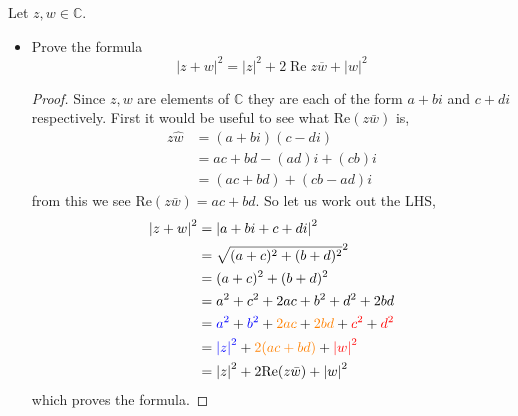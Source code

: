 \documentclass[11pt]{article}
\newenvironment{problem}[2][Problem\!]{\begin{trivlist}
\item[\hskip \labelsep {\bfseries #1}\hskip \labelsep {\bfseries #2.}]}{\end{trivlist}}
\newcommand{\cc}{\mathbb C}   %
\newcommand{\abs}[1]{\left\lvert#1\right\rvert} %
\renewcommand{\Re}{\operatorname{Re}}
\newcommand{\tcr}[1]{\textcolor{red}{#1}}
\newcommand{\tcb}[1]{\textcolor{blue}{#1}}
\newcommand{\tco}[1]{\textcolor{orange}{#1}}
\begin{document}
\begin{problem}{1.3}
Let $z,w \in \cc$. 
\begin{itemize}[itemsep=3em]
\item[(a)] Prove the formula
\[\abs{z+w}^2 = \abs{z}^2 + 2 \Re z\overline{w} + \abs{w}^2\]
\begin{example}
    \begin{proof}
        Since $z,w$ are elements of $\cc$ they are each of the form $a+bi$ and $c+di$ respectively. First it would be useful to see what $\text{Re}(z\bar{w})$ is,
        \begin{align*}
            z\hat{w} &= (a+bi)(c-di) \\
            &= ac + bd - (ad)i +(cb)i  \\
            &= (ac + bd) + (cb -ad)i
        \end{align*}
        from this we see Re$(z\bar{w}) = ac + bd$. So let us work out the LHS,
        \begin{align*}
            \abs{z +w}^{2} &= \abs{a + bi + c + di}^{2} \\
            &= \sqrt{(a+c)^{2} + (b+d)^{2}}^{2} \\
            &= (a+c)^{2} + (b+d)^{2} \\
            &= a^{2} + c^{2} + 2ac + b^{2} + d^{2} + 2bd \\
            &= \tcb{a^{2}} + \tcb{b^{2}} + \tco{2ac} + \tco{2bd}+ \tcr{c^{2}} + \tcr{d^{2}}  \\
            &= \tcb{\abs{z}^{2}} + \tco{2(ac + bd)} + \tcr{\abs{w}^{2}} \\
            &= \abs{z}^{2} + 2\text{Re}(z\bar{w}) + \abs{w}^{2}
        \end{align*}
        which proves the formula. 
    \end{proof}
\end{example}



\end{itemize}
\end{problem}
\end{document}
